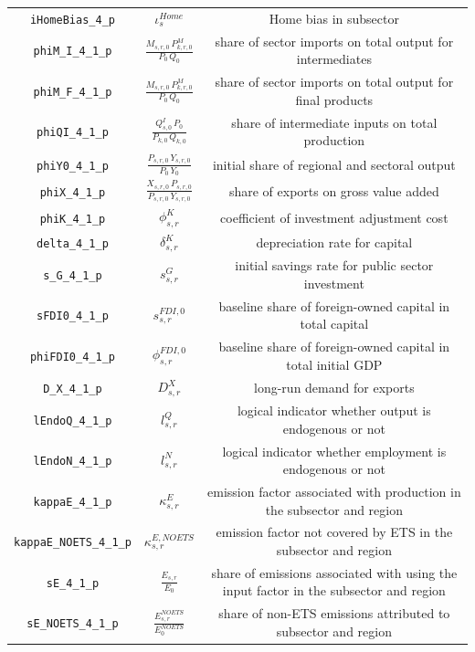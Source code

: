 \begin{center}
\begin{longtable}{ccc}
\texttt{iHomeBias\_4\_p} & ${\iota^{Home}_{s}}$ & Home bias in subsector\\
\texttt{phiM\_I\_4\_1\_p} & $\frac{M_{s,r,0} \, P^{M}_{k,r,0}}{P_{0} \, Q_{0}}$ & share of sector imports on total output for intermediates\\
\texttt{phiM\_F\_4\_1\_p} & $\frac{M_{s,r,0} \, P^{M}_{k,r,0}}{P_{0} \, Q_{0}}$ & share of sector imports on total output for final products\\
\texttt{phiQI\_4\_1\_p} & $\frac{Q^{I}_{s,0} \, P_{0}}{P_{k,0} \, Q_{k,0}}$ & share of intermediate inputs on total production\\
\texttt{phiY0\_4\_1\_p} & $\frac{P_{s,r,0} \, Y_{s,r,0}}{P_{0} \, Y_{0}}$ & initial share of regional and sectoral output\\
\texttt{phiX\_4\_1\_p} & $\frac{X_{s,r,0} \, P_{s,r,0}}{P_{s,r,0} \, Y_{s,r,0}}$ & share of exports on gross value added\\
\texttt{phiK\_4\_1\_p} & ${\phi^{K}_{s,r}}$ & coefficient of investment adjustment cost\\
\texttt{delta\_4\_1\_p} & ${\delta^{K}_{s,r}}$ & depreciation rate for capital\\
\texttt{s\_G\_4\_1\_p} & ${s^{G}_{s,r}}$ & initial savings rate for public sector investment\\
\texttt{sFDI0\_4\_1\_p} & ${s^{FDI,0}_{s,r}}$ & baseline share of foreign-owned capital in total capital\\
\texttt{phiFDI0\_4\_1\_p} & ${\phi^{FDI,0}_{s,r}}$ & baseline share of foreign-owned capital in total initial GDP\\
\texttt{D\_X\_4\_1\_p} & ${D^{X}_{s,r}}$ & long-run demand for exports\\
\texttt{lEndoQ\_4\_1\_p} & ${l^{Q}_{s,r}}$ & logical indicator whether output is endogenous or not\\
\texttt{lEndoN\_4\_1\_p} & ${l^{N}_{s,r}}$ & logical indicator whether employment is endogenous or not\\
\texttt{kappaE\_4\_1\_p} & ${\kappa^{E}_{s,r}}$ & emission factor associated with production in the subsector and region\\
\texttt{kappaE\_NOETS\_4\_1\_p} & ${\kappa^{E,NOETS}_{s,r}}$ & emission factor not covered by ETS in the subsector and region\\
\texttt{sE\_4\_1\_p} & ${\frac{E_{s,r}}{E_0}}$ & share of emissions associated with using the input factor in the subsector and region\\
\texttt{sE\_NOETS\_4\_1\_p} & ${\frac{E^{NOETS}_{s,r}}{E^{NOETS}_0}}$ & share of non-ETS emissions attributed to subsector and region\\

\end{longtable}
\end{center}
